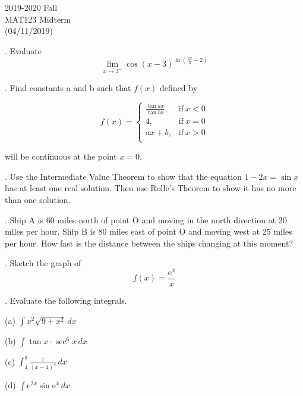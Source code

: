 \documentclass{article}
\begin{document}
\pagestyle{empty}
\large

\begin{center}
2019-2020 Fall\\MAT123 Midterm\\(04/11/2019)
\end{center}

. Evaluate
\[\lim_{x\to3^+}\cos(x-3)^{\ln\left(\frac{2x}{3}-2\right)}\]

\hfill

. Find constants a and b such that $f(x)$ defined by

\[
f(x) =
\begin{cases}
\displaystyle \frac{\tan ax}{\tan bx}, & \text{if}\ x < 0 \\[1em]
4, & \text{if}\ x = 0 \\[1em]
ax+b, & \text{if}\ x >0 \\
\end{cases}
\]

\hfill

\noindent will be continuous at the point $x=0$.

\hfill

. Use the Intermediate Value Theorem to show that the equation $1-2x =\sin x$ has at least one real solution. Then use Rolle's Theorem to show it has no more than one solution.

\hfill

. Ship A is 60 miles north of point O and moving in the north direction at 20 miles per hour. Ship B is 80 miles east of point O and moving west at 25 miles per hour. How fast is the distance between the ships changing at this moment?

\hfill

. Sketch the graph of
\[f(x)=\frac{\mathrm{e}^x}{x}\]

\hfill

. Evaluate the following integrals.

\hfill

\noindent (a) $\displaystyle\int x^2\sqrt{9+x^2}\,dx$

\hfill

\noindent (b) $\displaystyle\int\tan x\cdot\sec^6x\,dx$

\hfill

\noindent (c) $\displaystyle\int_4^8\frac{1}{(x-4)^3}\,dx$

\hfill

\noindent (d) $\displaystyle\int\mathrm{e}^{2x}\sin\mathrm{e}^x\,dx$
\end{document}
